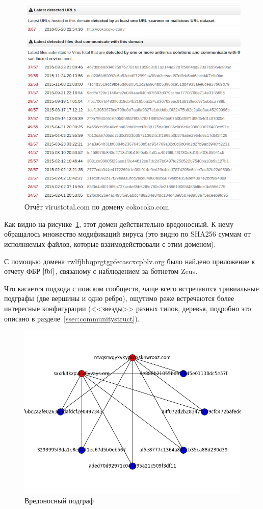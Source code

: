 \documentclass[a4paper,14pt]{extreport} %
\begin{document}
\begin{figure}[H]
	\centering
	\includegraphics[scale=0.7]{vt-detect.png}
	\caption{Отчёт virustotal.com по домену cokocoko.com}
	\label{fig:vt}
\end{figure}

Как видно на рисунке~\ref{fig:vt}, этот домен действительно вредоносный. К нему обращалось множество модификаций вируса (это видно по SHA256 суммам от исполняемых файлов, которые взаимодействовали с этим доменом).

С помощью домена rwlfjbbqprgtgpfecascxcpblv.org было найдено приложение к отчету ФБР $\cite{fbi}$, связаному с наблюдением за ботнетом Zeus.

Что касается подхода с поиском сообществ, чаще всего встречаются тривиальные подграфы (две вершины и одно ребро), ощутимо реже встречаются более интересные конфигурации (<<звезды>> разных типов, деревья, подробно это описано в разделе~\ref{ssec:communitystruct}).
\begin{figure}[H]
	\centering
	\includegraphics[scale=0.7]{mal-graph.png}
	\caption{Вредоносный подграф}
	\label{fig:mal-graph}
\end{figure}
\end{document}
